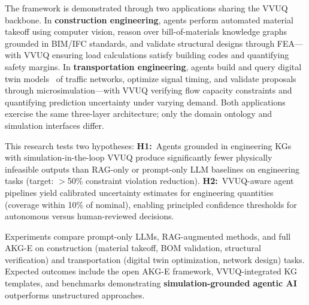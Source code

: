 \documentclass[conference, 10pt]{IEEEtran}
\begin{document}
The framework is demonstrated through two applications sharing the VVUQ backbone. In \textbf{construction engineering}, agents perform automated material takeoff using computer vision, reason over bill-of-materials knowledge graphs grounded in BIM/IFC standards, and validate structural designs through FEA---with VVUQ ensuring load calculations satisfy building codes and quantifying safety margins. In \textbf{transportation engineering}, agents build and query digital twin models~\cite{Tao2019DigitalTwin} of traffic networks, optimize signal timing, and validate proposals through microsimulation---with VVUQ verifying flow capacity constraints and quantifying prediction uncertainty under varying demand. Both applications exercise the same three-layer architecture; only the domain ontology and simulation interfaces differ.

This research tests two hypotheses: \textbf{H1:}~Agents grounded in engineering KGs with simulation-in-the-loop VVUQ produce significantly fewer physically infeasible outputs than RAG-only or prompt-only LLM baselines on engineering tasks (target: $>$50\% constraint violation reduction). \textbf{H2:}~VVUQ-aware agent pipelines yield calibrated uncertainty estimates for engineering quantities (coverage within 10\% of nominal), enabling principled confidence thresholds for autonomous versus human-reviewed decisions.

Experiments compare prompt-only LLMs, RAG-augmented methods, and full AKG-E on construction (material takeoff, BOM validation, structural verification) and transportation (digital twin optimization, network design) tasks. Expected outcomes include the open AKG-E framework, VVUQ-integrated KG templates, and benchmarks demonstrating \textbf{simulation-grounded agentic AI} outperforms unstructured approaches.



\end{document}
